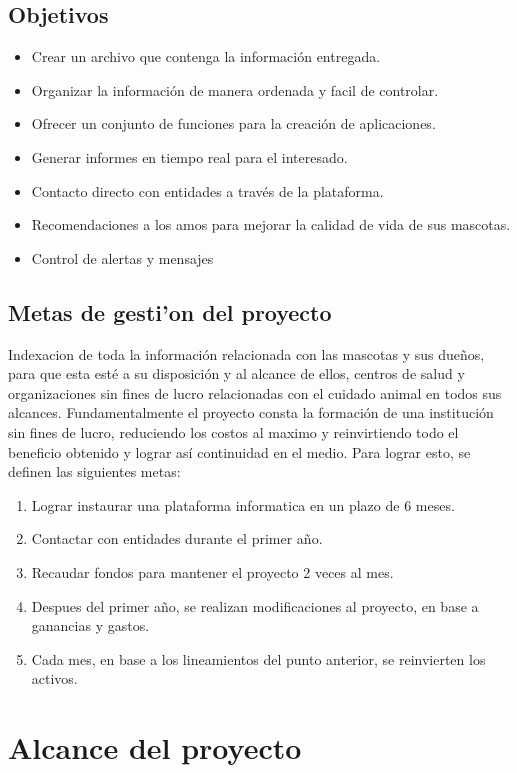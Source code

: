 \documentclass[letterpaper,openright,10pt,oneside]{report}
\begin{document}
		\section{Objetivos}
		\begin{itemize}
			\item Crear un archivo que contenga la información entregada.
			\item Organizar la información de manera ordenada y facil de controlar.
			\item Ofrecer un conjunto de funciones para la creación de aplicaciones.
			\item Generar informes en tiempo real para el interesado.
			\item Contacto directo con entidades a través de la plataforma.
			\item Recomendaciones a los amos para mejorar la calidad de vida de sus mascotas.
			\item Control de alertas y mensajes
\end{itemize}
		\section{Metas de gesti'on del proyecto}
		Indexacion de toda la información relacionada con las mascotas y sus dueños, para que esta esté a su disposición y al alcance de ellos, centros de salud y organizaciones sin fines de lucro relacionadas con el cuidado animal en todos sus alcances. Fundamentalmente el proyecto consta la formación de una institución sin fines de lucro, reduciendo los costos al maximo y reinvirtiendo todo el beneficio obtenido y lograr así continuidad en el medio. Para lograr esto, se definen las siguientes metas:\newline
		\begin{enumerate}
	\item Lograr instaurar una plataforma informatica en un plazo de 6 meses.
	\item Contactar con entidades durante el primer año.
	\item Recaudar fondos para mantener el proyecto 2 veces al mes.
	\item Despues del primer año, se realizan modificaciones al proyecto, en base a ganancias y gastos.
	\item Cada mes, en base a los lineamientos del punto anterior, se reinvierten los activos.
\end{enumerate}
	\chapter{Alcance del proyecto}
\end{document}
